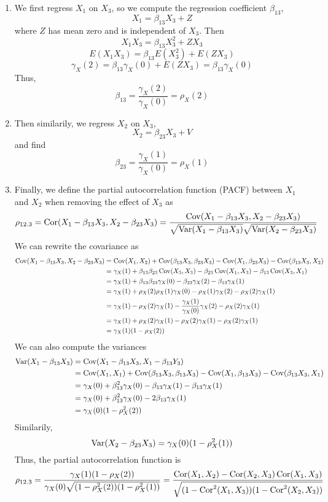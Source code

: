 \begin{enumerate}[label=(\roman*)]
    \item We first regress $X_1$ on $X_3$, so we compute the regression coefficient $\beta_{13}$,
    \[X_1 = \beta_{13}X_3 + Z\]
    where $Z$ has mean zero and is independent of $X_3$. Then 
    \[X_1X_3 = \beta_{13}X_3^2 + ZX_3\]
    \[E(X_1X_3) = \beta_{13}E(X_3^2) + E(ZX_3)\]
    \[\gamma_X(2) = \beta_{13}\gamma_X(0) + E(ZX_3) = \beta_{13}\gamma_X(0)\]
    Thus,
    \[\beta_{13} = \frac{\gamma_X(2)}{\gamma_X(0)} = \rho_X(2)\]
    \item Then similarily, we regress $X_2$ on $X_3$, 
    \[X_2 = \beta_{23}X_3 + V\]
    and find 
    \[\beta_{23} = \frac{\gamma_X(1)}{\gamma_X(0)} = \rho_X(1)\]
    \item Finally, we define the partial autocorrelation function (PACF) between $X_1$ and $X_2$ when removing the effect of $X_3$ as
    \[\rho_{12.3} = \operatorname{Cor}(X_1 - \beta_{13}X_3, X_2-\beta_{23}X_3) = \frac{\operatorname{Cov}(X_1 - \beta_{13}X_3, X_2 - \beta_{23}X_3)}{\sqrt{\operatorname{Var}(X_1-\beta_{13}X_3)}\sqrt{\operatorname{Var}(X_2-\beta_{23}X_3)}}\]
    We can rewrite the covariance as 
    \begin{align*}
        \operatorname{Cov}(X_1 - \beta_{13}X_3, X_2-\beta_{23}X_3) &= \operatorname{Cov}(X_1,X_2) + \operatorname{Cov}(\beta_{13}X_3, \beta_{23}X_3) - \operatorname{Cov}(X_1,\beta_{23}X_3) - \operatorname{Cov}(\beta_{13}X_3,X_2)\\
        &= \gamma_X(1) + \beta_{13}\beta_{23}\operatorname{Cov}(X_3,X_3) - \beta_{23}\operatorname{Cov}(X_1,X_3) - \beta_{13}\operatorname{Cov}(X_3,X_1)\\
        &= \gamma_X(1) + \beta_{13}\beta_{23}\gamma_X(0) - \beta_{23}\gamma_X(2) - \beta_{13}\gamma_X(1)\\
        &= \gamma_X(1) + \rho_X(2)\rho_X(1)\gamma_X(0) - \rho_X(1)\gamma_X(2) - \rho_X(2)\gamma_X(1)\\
        &= \gamma_X(1) - \rho_X(2)\gamma_X(1) - \frac{\gamma_X(1)}{\gamma_X(0)}\gamma_X(2) - \rho_X(2)\gamma_X(1)\\
        &= \gamma_X(1) + \rho_X(2)\gamma_X(1) - \rho_X(2)\gamma_X(1) - \rho_X(2)\gamma_X(1)\\
        &= \gamma_X(1)(1-\rho_X(2))
    \end{align*}
    We can also compute the variances 
    \begin{align*}
        \operatorname{Var}(X_1 - \beta_{13}X_3) &= \operatorname{Cov}(X_1 - \beta_{13}X_3, X_1 - \beta_{13}Y_3)\\
        &= \operatorname{Cov}(X_1,X_1) + \operatorname{Cov}(\beta_{13}X_3,\beta_{13}X_3) - \operatorname{Cov}(X_1,\beta_{13}X_3) - \operatorname{Cov}(\beta_{13}X_3,X_1)\\
        &= \gamma_X(0) + \beta_{13}^2\gamma_X(0) - \beta_{13}\gamma_X(1) - \beta_{13}\gamma_X(1)\\
        &= \gamma_X(0) + \beta_{13}^2\gamma_X(0) - 2\beta_{13}\gamma_X(1)\\
        &= \gamma_X(0)(1-\rho_X^2(2))
    \end{align*}
    Similarily, 
    \[\operatorname{Var}(X_2 - \beta_{23}X_3) = \gamma_X(0)(1- \rho_X^2(1))\]
    Thus, the partial autocorrelation function is
    \[\rho_{12.3} = \frac{\gamma_X(1)(1-\rho_X(2))}{\gamma_X(0)\sqrt{(1-\rho_X^2(2))(1-\rho_X^2(1))}} = \frac{\operatorname{Cor}(X_1,X_2) - \operatorname{Cor}(X_2,X_3)\operatorname{Cor}(X_1,X_3)}{\sqrt{(1-\operatorname{Cor}^2(X_1,X_3))(1-\operatorname{Cor}^2(X_2,X_3))}}\]
\end{enumerate}

